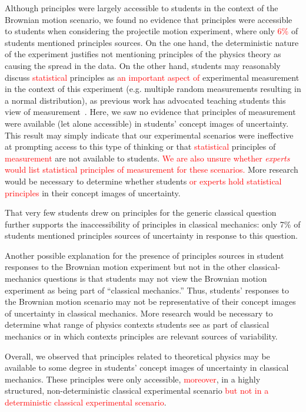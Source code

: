 \documentclass[english,aps,prstper,reprint,showpacs,longbibliography,superscriptaddress,nofootinbib]{revtex4-2}
\begin{document}
Although principles were largely accessible to students in the context of the Brownian motion scenario, we found no evidence that principles were accessible to students when considering the projectile motion experiment, where only \textcolor{red}{6\%} of students mentioned principles sources. On the one hand, the deterministic nature of the experiment justifies not mentioning principles of the physics theory as causing the spread in the data. On the other hand, students may reasonably discuss \textcolor{red}{statistical} principles as \textcolor{red}{an important aspect of} experimental measurement in the context of this experiment (e.g. multiple random measurements resulting in a normal distribution), as previous work has advocated teaching students this view of measurement~\cite{Evangelinos1999,Evangelinos2002,Allie2003,Pillay2008,Buffler2008}. Here, we saw no evidence that principles of measurement were available (let alone accessible) in students' concept images of uncertainty. This result may simply indicate that our experimental scenarios were ineffective at prompting access to this type of thinking or that \textcolor{red}{statistical} principles of \textcolor{red}{measurement} are not available to students. \textcolor{red}{We are also unsure whether \emph{experts} would list statistical principles of measurement for these scenarios.} More research would be necessary to determine whether students \textcolor{red}{or experts hold statistical principles} in their concept images of uncertainty.

That very few students drew on principles for the generic classical question further supports the inaccessibility of principles in classical mechanics: only 7\% of students mentioned principles sources of uncertainty in response to this question.

Another possible explanation for the presence of principles sources in student responses to the Brownian motion experiment but not in the other classical-mechanics questions is that students may not view the Brownian motion experiment as being part of ``classical mechanics.'' Thus, students' responses to the Brownian motion scenario may not be representative of their concept images of uncertainty in classical mechanics. More research would be necessary to determine what range of physics contexts students see as part of classical mechanics or in which contexts principles are relevant sources of variability.

Overall, we observed that principles related to theoretical physics may be available to some degree in students' concept images of uncertainty in classical mechanics. These principles were only accessible, \textcolor{red}{moreover}, in a highly structured, non-deterministic classical experimental scenario \textcolor{red}{but not in a deterministic classical experimental scenario}.
\end{document}
